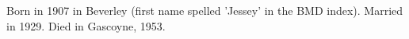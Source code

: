 
Born in 1907 in Beverley (first name spelled 'Jessey' in the BMD index).\cite{BMD_WA_birth_1907}
Married  in 1929.\cite{BMD_WA_marriage_1929}
Died in Gascoyne, 1953.\cite{BMD_WA_death_1953}

